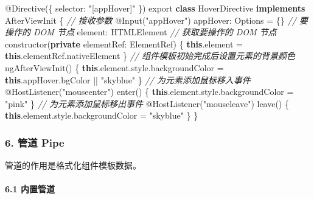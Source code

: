 \documentclass[
]{article}
\newenvironment{Shaded}{}{}
\newcommand{\AttributeTok}[1]{\textcolor[rgb]{0.49,0.56,0.16}{#1}}
\newcommand{\BuiltInTok}[1]{#1}
\newcommand{\CommentTok}[1]{\textcolor[rgb]{0.38,0.63,0.69}{\textit{#1}}}
\newcommand{\DataTypeTok}[1]{\textcolor[rgb]{0.56,0.13,0.00}{#1}}
\newcommand{\FunctionTok}[1]{\textcolor[rgb]{0.02,0.16,0.49}{#1}}
\newcommand{\ImportTok}[1]{#1}
\newcommand{\KeywordTok}[1]{\textcolor[rgb]{0.00,0.44,0.13}{\textbf{#1}}}
\newcommand{\NormalTok}[1]{#1}
\newcommand{\OperatorTok}[1]{\textcolor[rgb]{0.40,0.40,0.40}{#1}}
\newcommand{\StringTok}[1]{\textcolor[rgb]{0.25,0.44,0.63}{#1}}
\begin{document}
\begin{Shaded}
\begin{Highlighting}[]
\NormalTok{@}\FunctionTok{Directive}\NormalTok{(\{}
  \DataTypeTok{selector}\OperatorTok{:} \StringTok{"[appHover]"}
\NormalTok{\})}
\ImportTok{export} \KeywordTok{class}\NormalTok{ HoverDirective }\KeywordTok{implements}\NormalTok{ AfterViewInit \{}
  \CommentTok{// 接收参数}
\NormalTok{  @}\FunctionTok{Input}\NormalTok{(}\StringTok{"appHover"}\NormalTok{) }\DataTypeTok{appHover}\OperatorTok{:}\NormalTok{ Options }\OperatorTok{=}\NormalTok{ \{\}}
  \CommentTok{// 要操作的 DOM 节点}
  \DataTypeTok{element}\OperatorTok{:} \BuiltInTok{HTMLElement}
	\CommentTok{// 获取要操作的 DOM 节点}
  \FunctionTok{constructor}\NormalTok{(}\KeywordTok{private} \DataTypeTok{elementRef}\OperatorTok{:}\NormalTok{ ElementRef) \{}
    \KeywordTok{this}\OperatorTok{.}\AttributeTok{element} \OperatorTok{=} \KeywordTok{this}\OperatorTok{.}\AttributeTok{elementRef}\OperatorTok{.}\AttributeTok{nativeElement}
\NormalTok{  \}}
	\CommentTok{// 组件模板初始完成后设置元素的背景颜色}
  \FunctionTok{ngAfterViewInit}\NormalTok{() \{}
    \KeywordTok{this}\OperatorTok{.}\AttributeTok{element}\OperatorTok{.}\AttributeTok{style}\OperatorTok{.}\AttributeTok{backgroundColor} \OperatorTok{=} \KeywordTok{this}\OperatorTok{.}\AttributeTok{appHover}\OperatorTok{.}\AttributeTok{bgColor} \OperatorTok{||} \StringTok{"skyblue"}
\NormalTok{  \}}
	\CommentTok{// 为元素添加鼠标移入事件}
\NormalTok{  @}\FunctionTok{HostListener}\NormalTok{(}\StringTok{"mouseenter"}\NormalTok{) }\FunctionTok{enter}\NormalTok{() \{}
    \KeywordTok{this}\OperatorTok{.}\AttributeTok{element}\OperatorTok{.}\AttributeTok{style}\OperatorTok{.}\AttributeTok{backgroundColor} \OperatorTok{=} \StringTok{"pink"}
\NormalTok{  \}}
	\CommentTok{// 为元素添加鼠标移出事件}
\NormalTok{  @}\FunctionTok{HostListener}\NormalTok{(}\StringTok{"mouseleave"}\NormalTok{) }\FunctionTok{leave}\NormalTok{() \{}
    \KeywordTok{this}\OperatorTok{.}\AttributeTok{element}\OperatorTok{.}\AttributeTok{style}\OperatorTok{.}\AttributeTok{backgroundColor} \OperatorTok{=} \StringTok{"skyblue"}
\NormalTok{  \}}
\NormalTok{\}}
\end{Highlighting}
\end{Shaded}

\hypertarget{6-ux7ba1ux9053-pipe}{%
\subsubsection{6. 管道 Pipe}\label{6-ux7ba1ux9053-pipe}}

管道的作用是格式化组件模板数据。

\hypertarget{61-ux5185ux7f6eux7ba1ux9053}{%
\paragraph{6.1 内置管道}\label{61-ux5185ux7f6eux7ba1ux9053}}
\end{document}
